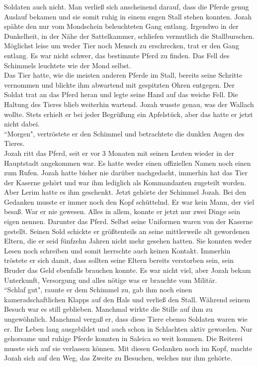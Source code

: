 Soldaten auch nicht. Man verließ sich anscheinend darauf, dass die Pferde genug Auslauf bekamen und 
sie somit ruhig in einem engen Stall stehen konnten. Jozah spähte den nur vom Mondschein 
beleuchteten Gang entlang. Irgendwo in der Dunkelheit, in der Nähe der Sattelkammer, schliefen 
vermutlich die Stallburschen. Möglichst leise um weder Tier noch Mensch zu erschrecken, trat er den 
Gang entlang. Es war nicht schwer, das bestimmte Pferd zu finden. Das Fell des Schimmels leuchtete 
wie der Mond selbst. \\
Das Tier hatte, wie die meisten anderen Pferde im Stall, bereits seine Schritte vernommen und 
blickte ihm abwartend mit gespitzten Ohren entgegen. Der Soldat trat an das Pferd heran und legte 
seine Hand auf das weiche Fell. Die Haltung des Tieres blieb weiterhin wartend. Jozah wusste genau, 
was der Wallach wollte. Stets erhielt er bei jeder Begrüßung ein Apfelstück, aber das hatte er 
jetzt nicht dabei. \\
 ``Morgen", vertröstete er den Schimmel und betrachtete die dunklen Augen des Tieres. \\
Jozah ritt das Pferd, seit er vor 3 Monaten mit seinen Leuten wieder in der Hauptstadt angekommen 
war. Es hatte weder einen offiziellen Namen noch einen zum Rufen. Jozah hatte bisher nie darüber 
nachgedacht, immerhin hat das Tier der Kaserne gehört und war ihm lediglich als Kommandanten 
zugeteilt worden. Aber Lerim hatte es ihm geschenkt. Jetzt gehörte der Schimmel Jozah. Bei den 
Gedanken musste er immer noch den Kopf schüttelnd. Er war kein Mann, der viel besaß. War er nie 
gewesen. Alles in allem, konnte er jetzt nur zwei Dinge sein eigen nennen. Darunter das Pferd. 
Selbst seine Uniformen waren von der Kaserne gestellt. Seinen Sold schickte er größtenteils an 
seine mittlerweile alt gewordenen Eltern, die er seid fünfzehn Jahren nicht mehr gesehen hatten. 
Sie konnten weder Lesen noch schreiben und somit herrschte auch keinen Kontakt. Immerhin tröstete 
er sich damit, dass sollten seine Eltern bereits verstorben sein, sein Bruder das Geld ebenfalls 
brauchen konnte. Es war nicht viel, aber Jozah bekam Unterkunft, Versorgung und alles nötige was er 
brauchte vom Militär. \\
 ``Schlaf gut", raunte er dem Schimmel zu, gab ihm noch einen kameradschaftlichen Klapps auf den 
Hals und verließ den Stall. Während seinem Besuch war es still geblieben. Manchmal wirkte die Stille 
auf ihm zu ungewöhnlich. Manchmal vergaß er, dass diese Tiere ebenso Soldaten waren wie er. Ihr 
Leben lang ausgebildet und auch schon in Schlachten aktiv geworden. Nur gehorsame und ruhige Pferde 
konnten in Saleica so weit kommen. Die Reiterei musste sich auf sie verlassen können. Mit diesen 
Gedanken noch im Kopf, machte Jozah sich auf den Weg, das Zweite zu Besuchen, welches nur ihm 
gehörte. \\

